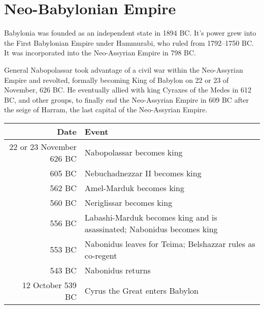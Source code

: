 \section{Neo-Babylonian Empire}
Babylonia was founded as an independent state in 1894 BC\@. It's power grew into the First
Babylonian Empire under Hammurabi, who ruled from 1792--1750 BC\@. It was incorporated into the Neo-Assyrian Empire in 798 BC.

General Nabopolassar took advantage of a civil war within the Neo-Assyrian Empire and revolted, formally becoming King
of Babylon on 22 or 23 of November, 626 BC\@. He eventually allied with king Cyraxes of the Medes in 612 BC, and other groups,
to finally end the Neo-Assyrian Empire in 609 BC after the seige of Harram, the last capital of the Neo-Assyrian Empire.


\begin{center}
    \begin{tabularx}{\textwidth}{@{}rX@{}}
        \toprule
        \textbf{Date} & \textbf{Event} \\
        \midrule
        22 or 23 November 626 BC & Nabopolassar becomes king \\
        605 BC & Nebuchadnezzar II becomes king \\
        562 BC & Amel-Marduk becomes king \\
        560 BC & Neriglissar becomes king \\
        556 BC & Labashi-Marduk becomes king and is asassinated; Nabonidus becomes king \\
        553 BC & Nabonidus leaves for Teima; Belshazzar rules as co-regent \\
        543 BC & Nabonidus returns \\
        12 October 539 BC & Cyrus the Great enters Babylon \\
        \bottomrule
    \end{tabularx}
\end{center}
